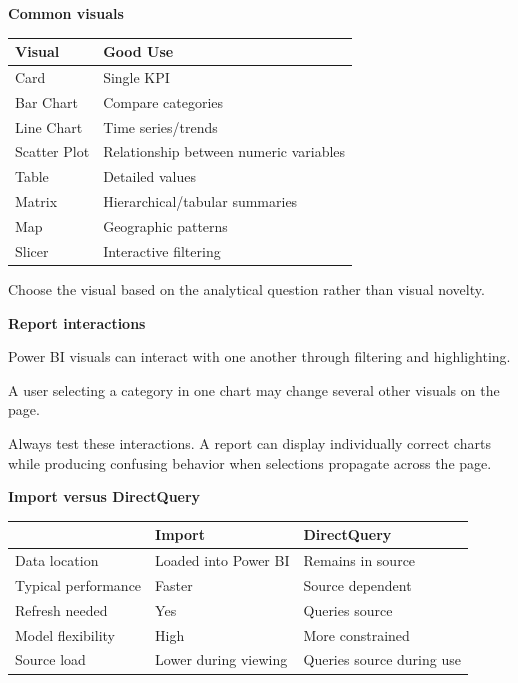 \documentclass[11pt,letterpaper]{article}
\begin{document}
\textbf{Common visuals}

\begin{center}
\begin{tabularx}{\textwidth}{lX}
\toprule
Visual & Good Use \\
\midrule
Card & Single KPI \\
Bar Chart & Compare categories \\
Line Chart & Time series/trends \\
Scatter Plot & Relationship between numeric variables \\
Table & Detailed values \\
Matrix & Hierarchical/tabular summaries \\
Map & Geographic patterns \\
Slicer & Interactive filtering \\
\bottomrule
\end{tabularx}
\end{center}

Choose the visual based on the analytical question rather than visual novelty.



\textbf{Report interactions}

Power BI visuals can interact with one another through filtering and
highlighting.

A user selecting a category in one chart may change several other visuals on
the page.

Always test these interactions. A report can display individually correct
charts while producing confusing behavior when selections propagate across the
page.



\textbf{Import versus DirectQuery}

\begin{center}
\begin{tabularx}{\textwidth}{lXX}
\toprule
 & Import & DirectQuery \\
\midrule
Data location & Loaded into Power BI & Remains in source \\
Typical performance & Faster & Source dependent \\
Refresh needed & Yes & Queries source \\
Model flexibility & High & More constrained \\
Source load & Lower during viewing & Queries source during use \\
\bottomrule
\end{tabularx}
\end{center}
\end{document}
